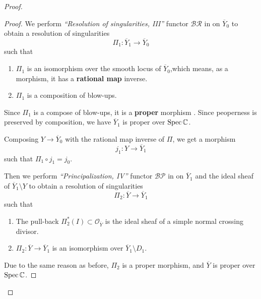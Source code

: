\begin{remark}
\begin{proof}
\begin{enumerate}
\begin{proof}
                      We perform \emph{``Resolution of singularities, III''} functor $\mathcal{BR}$ in \cite[Thm.~36]{kollar-seattle} on $\overline Y_0$ to obtain
                      a resolution of singularities
                      \[
                          \Pi_1: \overline Y_1 \to \overline Y_0
                      \]
                      such that
                      \begin{enumerate}
                          \item $\Pi_1$ is an isomorphism over the smooth locus of $\overline Y_0$,which means, as a morphism, it has a \textbf{rational map} inverse.
                          \item $\Pi_1$ is a composition of blow-ups.
                      \end{enumerate}

                      Since $\Pi_1$ is a compose of blow-ups, it is a \textbf{proper} morphism \cite[\href{https://stacks.math.columbia.edu/tag/02NS}{Tag 02NS}, \href{https://stacks.math.columbia.edu/tag/01WC}{Tag 01WC}]{stacks-project}.
                      Since peoperness is preserved by composition, we have $\overline Y_1$ is proper over $\operatorname{Spec} \mathbb{C}$.

                      Composing $Y\to\overline Y_0$ with the rational map inverse of $\Pi$, we get a morphism
                      \[
                          j_1: Y \to \overline Y_1
                      \]
                      such that $\Pi_1 \circ j_1 = j_0$.

                      Then we perform \emph{``Principalization, IV''} functor $\mathcal{BP}$ in \cite[Thm.~35]{kollar-seattle} on $\overline Y_1$ and the ideal sheaf
                      of $\overline Y_1\setminus Y$ to obtain
                      a resolution of singularities
                      \[
                          \Pi_2: \overline Y \to \overline Y_1
                      \]
                      such that
                      \begin{enumerate}
                          \item The pull-back $\Pi_2^*(I) \subset \mathcal{O}_{\overline Y}$ is the ideal sheaf of a simple normal crossing divisor.
                          \item $\Pi_2 : \overline Y \to \overline Y_1$ is an isomorphism over $\overline Y_1 \setminus D_1$.
                      \end{enumerate}

                      Due to the same reason as before, $\Pi_2$ is a proper morphism, and $\overline Y$ is proper over $\operatorname{Spec} \mathbb{C}$.


\end{proof}
\end{enumerate}
\end{proof}
\end{remark}
